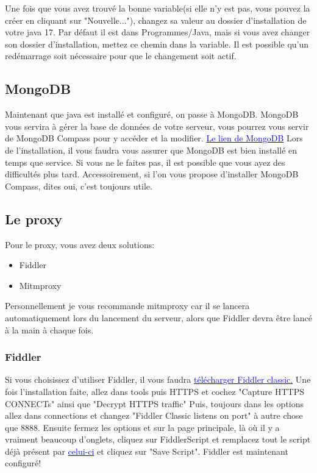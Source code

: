\documentclass{article}
\begin{document}
Une fois que vous avez trouvé la bonne variable(si elle n'y est pas, vous pouvez la créer en cliquant sur "Nouvelle..."), changez sa valeur au dossier d'installation de votre java 17. Par défaut il est dans Programmes/Java, mais si vous avez changer son dossier d'installation, mettez ce chemin dans la variable. Il est possible qu'un redémarrage soit nécessaire pour que le changement soit actif.

\subsection{MongoDB}
Maintenant que java est installé et configuré, on passe à MongoDB.\newline
MongoDB vous servira à gérer la base de données de votre serveur, vous pourrez vous servir de MongoDB Compass pour y accéder et la modifier.\newline
\href{https://fastdl.mongodb.org/windows/mongodb-windows-x86_64-5.0.7-signed.msi}{\textcolor{blue}{Le lien de MongoDB}}\newline
Lors de l'installation, il vous faudra vous assurer que MongoDB est bien installé en temps que service. Si vous ne le faites pas, il est possible que vous ayez des difficultés plus tard. Accessoirement, si l'on vous propose d'installer MongoDB Compass, dites oui, c'est toujours utile.

\subsection{Le proxy}
Pour le proxy, vous avez deux solutions:
\begin{itemize}
	\item Fiddler
	\item Mitmproxy
\end{itemize}
Personnellement je vous recommande mitmproxy car il se lancera automatiquement lors du lancement du serveur, alors que Fiddler devra être lancé à la main à chaque fois.

\subsubsection{Fiddler}
Si vous choisissez d'utiliser Fiddler, il vous faudra \href{https://www.telerik.com/download/fiddler/fiddler4}{\textcolor{blue}{télécharger Fiddler classic.}}\newline
Une fois l'installation faite, allez dans tools puis HTTPS et cochez "Capture HTTPS CONNECTs" ainsi que "Decrypt HTTPS traffic"\newline
Puis, toujours dans les options allez dans connections et changez "Fiddler Classic listens on port" à autre chose que 8888.\newline
Ensuite fermez les options et sur la page principale, là où il y a vraiment beaucoup d'onglets, cliquez sur FiddlerScript et remplacez tout le script déjà présent par \href{https://github.lunatic.moe/fiddlerscript}{\textcolor{blue}{celui-ci}} et cliquez sur "Save Script".\newline
Fiddler est maintenant configuré!
\end{document}
